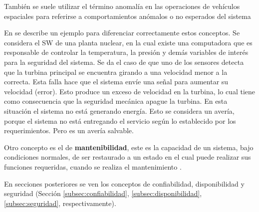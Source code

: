 También se suele utilizar el término anomalía en las operaciones de vehículos espaciales para
referirse a comportamientos anómalos o no esperados del sistema \citep{SpaceSystemFailures}

En \cite{FTDesign} se describe un ejemplo para diferenciar correctamente estos conceptos. Se considera
el \ac{SW} de una planta nuclear, en la cual existe una computadora que es responsable de controlar
la temperatura, la presión y demás variables de interés para la seguridad del sistema. Se da el
caso de que uno de los sensores detecta que la turbina principal se encuentra girando a una
velocidad menor a la correcta. Esta falla hace que el sistema envíe una señal para aumentar su
velocidad (error). Esto produce un exceso de velocidad en la turbina, lo cual tiene como
consecuencia que la seguridad mecánica apague la turbina. En esta situación el sistema no está
generando energía. Esto se considera un avería, porque el sistema no está entregando el servicio
según lo establecido por los requerimientos. Pero es un avería salvable.

Otro concepto es el de \textbf{mantenibilidad}, este es la capacidad de un sistema, bajo condiciones normales, de ser restaurado a un estado en el cual puede realizar sus funciones requeridas, cuando se realiza el mantenimiento \citep{Rausand04}.

En secciones posteriores se ven los conceptos de confiabilidad, disponibilidad y seguridad (Sección \ref{subsec:confiabilidad}, \ref{subsec:disponibilidad}, \ref{subsec:seguridad}, respectivamente).
